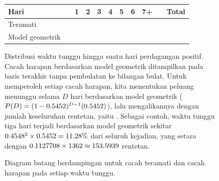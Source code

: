 \begin{figure}
\centering
\begin{tabular}{ll ccc ccc c ll}
  \hline
  Hari & \hspace{1mm} &
      1 & 2 & 3 & 4 & 5 & 6 & 7+ & \hspace{1mm} & Total \\
  \hline
  Teramati & & \spdaysA{} & \spdaysB{} & \spdaysC{} &
      \spdaysD{} & \spdaysE{} & \spdaysF{} & \spdaysG{} & &
      \spdays{} \\
  Model geometrik & & \spdaysEA{} & \spdaysEB{} & \spdaysEC{} &
      \spdaysED{} & \spdaysEE{} & \spdaysEF{} & \spdaysEG{} & &
      \spdays{} \\
  \hline
\end{tabular}
\caption{Distribusi waktu tunggu hingga suatu hari perdagangan
    positif.
    Cacah harapan berdasarkan model geometrik
    ditampilkan pada baris terakhir tanpa pembulatan ke bilangan bulat.
    Untuk memperoleh setiap cacah harapan, kita menentukan peluang
    menunggu selama $D$ hari berdasarkan model geometrik
    ($P(D) = (1-0.5452{})^{D-1}(0.5452{})$),
    lalu mengalikannya dengan jumlah keseluruhan rentetan, yaitu \spdays{}.
    Sebagai contoh, waktu tunggu tiga hari terjadi berdasarkan
    model geometrik sekitar
    $0.4548{}^2\times 0.5452{} = 11.28\%{}$
    dari seluruh kejadian, yang setara dengan
    $0.1127708{} \times 1362{} \approx 153.5939$ rentetan.}
\label{sAndP500TimeToPosTrade2}
\end{figure}

\begin{figure}
  \centering
  \caption{Diagram batang berdampingan untuk cacah teramati
      dan cacah harapan pada setiap waktu tunggu.}
  \label{geomFitEvaluationForSP500}
\end{figure}

